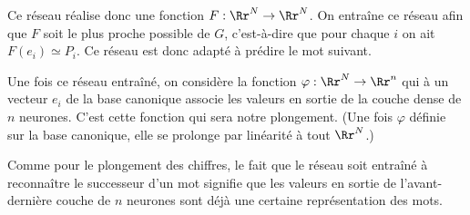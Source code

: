 \documentclass[11pt,class=report,crop=false]{standalone}
\begin{document}

Ce réseau réalise donc une fonction $F : \Rr^N \to \Rr^N$.
On entraîne ce réseau afin que $F$ soit le plus proche possible de $G$, c'est-à-dire que pour chaque $i$ on ait $F(e_i) \simeq P_i$. Ce réseau est donc adapté à prédire le mot suivant.

Une fois ce réseau entraîné, on considère la fonction $\varphi : \Rr^N \to \Rr^n$ qui à un vecteur $e_i$ de la base canonique associe les valeurs en sortie de la couche dense de $n$ neurones. C'est cette fonction qui sera notre plongement. (Une fois $\varphi$ définie sur la base canonique, elle se prolonge par linéarité à tout $\Rr^N$.)

Comme pour le plongement des chiffres, le fait que le réseau soit entraîné à reconnaître le successeur d'un mot signifie que les valeurs en sortie de l'avant-dernière couche de $n$ neurones sont déjà une certaine représentation des mots. 
\end{document}

